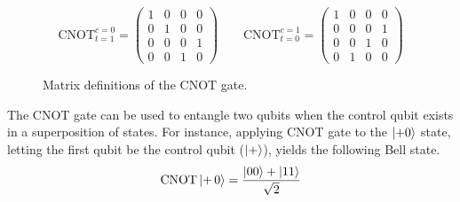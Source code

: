 \begin{figure}[H]
    \centering
    \begin{equation*}
    \text{CNOT}^{c=0}_{t=1} =
        \begin{pmatrix}
            1 & 0 & 0 & 0 \\
            0 & 1 & 0 & 0 \\
            0 & 0 & 0 & 1 \\
            0 & 0 & 1 & 0
        \end{pmatrix} \qquad
        \text{CNOT}^{c=1}_{t=0} =
        \begin{pmatrix}
            1 & 0 & 0 & 0 \\
            0 & 0 & 0 & 1 \\
            0 & 0 & 1 & 0 \\
            0 & 1 & 0 & 0
        \end{pmatrix}
    \end{equation*}
    \caption{Matrix definitions of the CNOT gate.}
    \label{cnot-definition}
\end{figure}

The CNOT gate can be used to entangle two qubits when the control qubit exists in a superposition of states. For instance, applying CNOT gate to the $\ket{+0}$ state, letting the first qubit be the control qubit ($\ket +$), yields the following Bell state.
\begin{equation*}
    \text{CNOT} \ket{+ \, 0} = \frac{\ket{00} + \ket{11}}{\sqrt 2}
\end{equation*}

